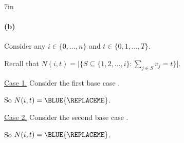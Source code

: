 \begin{answerBox}{7in}   %
  

  \paragraph{(b)}

  \begin{longFormProof}%

    \step Consider any $i\in\{0,\ldots,n\}$ and $t\in\{0,1,\ldots,T\}$.

    \step Recall that $N(i, t) = \big|\big\{ S\subseteq \{1,2,\ldots,i\} : \sum_{j\in S} v_{j} = t\big\}\big|$.

    \medskip 

    \begin{block}
      \step \underline{Case 1.} Consider the first base case \BLUE{\REPLACEME}.

      \begin{blue}
        
        \step \REPLACEME

      \end{blue}

      \step So $N(i, t) = \BLUE{\REPLACEME}$.
   
    \end{block}

    \medskip

    \begin{block}
      \step \underline{Case 2.} Consider the second base case \BLUE{\REPLACEME}.

      \begin{blue}
        
        \step \REPLACEME

      \end{blue}

      \step So $N(i, t) = \BLUE{\REPLACEME}$.
   
    \end{block}

    \medskip


\end{longFormProof}
\end{answerBox}
